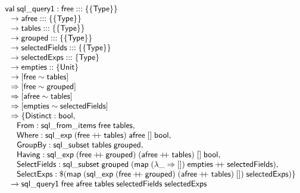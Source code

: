 \documentclass{article}
\newcommand{\mt}[1]{\mathsf{#1}}
\newcommand{\rc}{+ \hspace{-.075in} + \;}
\begin{document}
$$\begin{array}{l}
  \mt{val} \; \mt{sql\_query1} : \mt{free} ::: \{\{\mt{Type}\}\} \\
  \hspace{.1in} \to \mt{afree} ::: \{\{\mt{Type}\}\} \\
  \hspace{.1in} \to \mt{tables} ::: \{\{\mt{Type}\}\} \\
  \hspace{.1in} \to \mt{grouped} ::: \{\{\mt{Type}\}\} \\
  \hspace{.1in} \to \mt{selectedFields} ::: \{\{\mt{Type}\}\} \\
  \hspace{.1in} \to \mt{selectedExps} ::: \{\mt{Type}\} \\
  \hspace{.1in} \to \mt{empties} :: \{\mt{Unit}\} \\
  \hspace{.1in} \to [\mt{free} \sim \mt{tables}] \\
  \hspace{.1in} \Rightarrow [\mt{free} \sim \mt{grouped}] \\
  \hspace{.1in} \Rightarrow [\mt{afree} \sim \mt{tables}] \\
  \hspace{.1in} \Rightarrow [\mt{empties} \sim \mt{selectedFields}] \\
  \hspace{.1in} \Rightarrow \{\mt{Distinct} : \mt{bool}, \\
  \hspace{.2in} \mt{From} : \mt{sql\_from\_items} \; \mt{free} \; \mt{tables}, \\
  \hspace{.2in} \mt{Where} : \mt{sql\_exp} \; (\mt{free} \rc \mt{tables}) \; \mt{afree} \; [] \; \mt{bool}, \\
  \hspace{.2in} \mt{GroupBy} : \mt{sql\_subset} \; \mt{tables} \; \mt{grouped}, \\
  \hspace{.2in} \mt{Having} : \mt{sql\_exp} \; (\mt{free} \rc \mt{grouped}) \; (\mt{afree} \rc \mt{tables}) \; [] \; \mt{bool}, \\
  \hspace{.2in} \mt{SelectFields} : \mt{sql\_subset} \; \mt{grouped} \; (\mt{map} \; (\lambda \_ \Rightarrow []) \; \mt{empties} \rc \mt{selectedFields}), \\
  \hspace{.2in} \mt {SelectExps} : \$(\mt{map} \; (\mt{sql\_exp} \; (\mt{free} \rc \mt{grouped}) \; (\mt{afree} \rc \mt{tables}) \; []) \; \mt{selectedExps}) \} \\
  \hspace{.1in} \to \mt{sql\_query1} \; \mt{free} \; \mt{afree} \; \mt{tables} \; \mt{selectedFields} \; \mt{selectedExps}
\end{array}$$
\end{document}
